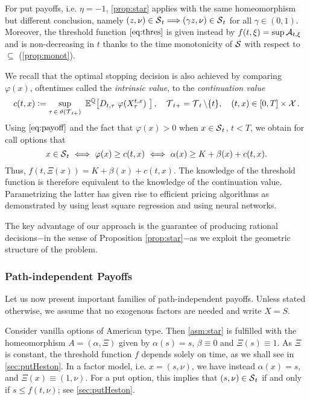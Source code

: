 \begin{remark}
For put payoffs, i.e. $\eta =-1$,  \cref{prop:star} applies with the same homeomorphism but different conclusion, namely  $(z,\nu)\in \operatorname{\mathcal{S}}_t \Longrightarrow (\gamma z,\nu) \in \operatorname{\mathcal{S}}_t$ for all $\gamma \in (0,1)$. Moreover, the threshold function $\eqref{eq:thres}$ is given instead by 
$f(t,\xi) = \sup \operatorname{\mathcal{A}}_{t,\xi}$ and is  non-decreasing in $t$  thanks to the time  monotonicity of $\operatorname{\mathcal{S}}$ with respect to  $\subseteq$ (\cref{prop:monot}). 
\end{remark}

\begin{remark}
We recall that the optimal stopping decision is also achieved by comparing 
$\varphi(x)$, oftentimes called the \textit{intrinsic value}, to the \textit{continuation value}
\begin{equation} \label{eq:contValue}
c(t,x) := \underset{\tau \, \in\,  \vartheta(\calT_{t+})}{\text{sup}} \
\E^{\Q}\! \left[ D_{t,\tau}\ \varphi(X^{t,x}_\tau)\ \right],\quad  \calT_{t+} = \calT_t \setminus\{t\}, \quad (t,x)\in [0,T]\times \calX.
\end{equation}
Using $\eqref{eq:payoff}$ and the fact that $\varphi(x)>0$ when $x\in \operatorname{\mathcal{S}}_t$, $t<T$, we obtain for call options that  
$$x \in \calS_t \ \Longleftrightarrow \ \varphi(x) \ge c(t,x) \ \Longleftrightarrow \ \alpha(x) \ge K + \beta(x) + c(t,x).$$
Thus, $f(t,\Xi(x)) = K+ \beta(x)  +  c(t,x)$. The knowledge of the threshold function is therefore equivalent to the knowledge of the continuation value.  Parametrizing  the latter
 has given rise to efficient pricing algorithms as demonstrated by \citet{LSMC} using least square regression and 
 \citet{Kohler} using neural networks.

The key advantage of our  approach  is the guarantee of producing  rational decisions$-$in the sense of Proposition \ref{prop:star}$-$as we exploit the geometric structure of the problem. 
\end{remark}

\subsubsection*{Path-independent Payoffs}
Let us now present important families of path-independent payoffs. Unless stated otherwise,  we assume that no exogenous factors are needed  and write $X=S$. 

\begin{example}\label{ex:vanilla}

Consider vanilla  options of American type. 
Then \cref{asm:star} is fulfilled with the homeomorphism $A = (\alpha,\Xi)$ given by $\alpha(s) = s$, $\beta \equiv 0$ and $\Xi(s) \equiv 1$. 
As $\Xi$ is constant, the threshold function $f$ depends solely on time, as we shall see in  \cref{sec:putHeston}.   In a factor model, i.e. $x = (s,\nu)$, we have instead $\alpha(x)=s$, and $\Xi(x) \equiv (1,\nu)$. For a put option, this implies that $(s,\nu) \in \operatorname{\mathcal{S}}_t$ if and only if $s\le f(t,\nu)$; see \cref{sec:putHeston}.   

\end{example}

